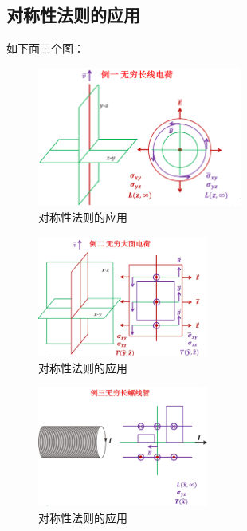 \documentclass[12pt,onecolumn,a4paper]{book}
\numberwithin{table}{subsection}
\numberwithin{equation}{subsection}
\begin{document}
\subsection{对称性法则的应用}

如下面三个图：

\begin{figure}[ht]
    \centering
    \includegraphics[width=0.6\textwidth]{pic/6.5.4.3.png}
    \caption{对称性法则的应用}
\end{figure}

\begin{figure}[ht]
    \centering
    \includegraphics[width=0.5\textwidth]{pic/6.5.4.1.png}
    \caption{对称性法则的应用}
\end{figure}

\begin{figure}[ht]
    \centering
    \includegraphics[width=0.5\textwidth]{pic/6.5.4.2.png}
    \caption{对称性法则的应用}
\end{figure}

\newpage
\end{document}
